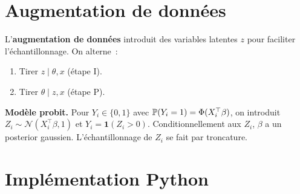 \section{Augmentation de donn\'ees}

\begin{definition}
L'\textbf{augmentation de donn\'ees} introduit des variables latentes
$z$ pour faciliter l'\'echantillonnage. On alterne~:
\begin{enumerate}
  \item Tirer $z \mid \theta, x$ (\'etape I).
  \item Tirer $\theta \mid z, x$ (\'etape P).
\end{enumerate}
\end{definition}

\begin{exemple}
\textbf{Mod\`ele probit.} Pour $Y_i \in \{0, 1\}$ avec
$\mathbb{P}(Y_i = 1) = \Phi(X_i^\top \beta)$, on introduit
$Z_i \sim \mathcal{N}(X_i^\top \beta, 1)$ et $Y_i = \mathbf{1}(Z_i > 0)$.
Conditionnellement aux $Z_i$, $\beta$ a un posterior gaussien. L'\'echantillonnage
de $Z_i$ se fait par troncature.
\end{exemple}

\section{Impl\'ementation Python}

